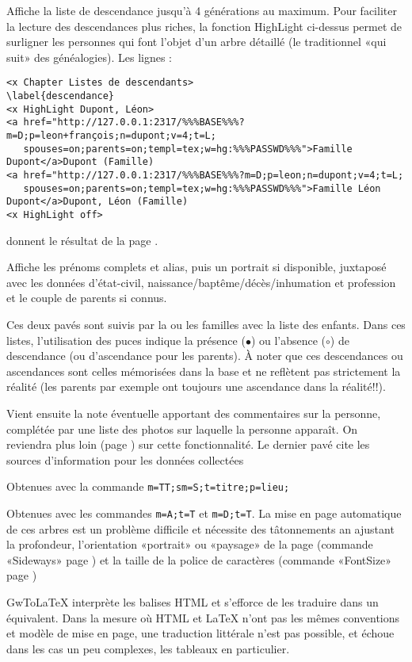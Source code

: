 \begin{description}[style=nextline]
\item[Liste de descendance] Affiche la liste de descendance jusqu'à 4
générations au maximum. Pour faciliter la lecture des descendances plus riches,
la fonction HighLight ci-dessus permet de surligner les personnes
qui font l'objet d'un arbre détaillé (le traditionnel «qui suit» des généalogies).
Les lignes :
\begin{verbatim}
<x Chapter Listes de descendants>
\label{descendance}
<x HighLight Dupont, Léon>
<a href="http://127.0.0.1:2317/%%%BASE%%%?m=D;p=leon+françois;n=dupont;v=4;t=L;
   spouses=on;parents=on;templ=tex;w=hg:%%%PASSWD%%%">Famille Dupont</a>Dupont (Famille)
<a href="http://127.0.0.1:2317/%%%BASE%%%?m=D;p=leon;n=dupont;v=4;t=L;
   spouses=on;parents=on;templ=tex;w=hg:%%%PASSWD%%%">Famille Léon Dupont</a>Dupont, Léon (Famille)
<x HighLight off>
\end{verbatim}
donnent le résultat de la page \pageref{descendance}.

\item[Page perso] Affiche les prénoms complets et alias, puis
un portrait si disponible, juxtaposé avec les
données d'état-civil, naissance/baptême/décès/inhumation et profession
et le couple de parents si connus.

Ces deux pavés sont suivis par la ou les familles avec la liste des enfants.
Dans ces listes, l'utilisation des puces indique la présence ($\bullet$)
ou l'absence ($\circ$) de descendance (ou d'ascendance pour les parents).
À noter que ces descendances ou ascendances sont celles mémorisées dans la base
et ne reflètent pas strictement la réalité (les parents par exemple ont toujours
une ascendance dans la réalité!!).

Vient ensuite la note éventuelle apportant des commentaires sur la personne,
complétée par une liste des photos sur laquelle la personne apparaît. 
On reviendra plus loin (page \pageref{images}) sur cette fonctionnalité.
Le dernier pavé cite les sources d'information pour les données collectées


\item[Liste par titre] Obtenues avec la commande
\verb|m=TT;sm=S;t=titre;p=lieu;|

\item[Arbres] Obtenues avec les commandes \verb|m=A;t=T| et \verb|m=D;t=T|.
La mise en page automatique de ces arbres est un problème difficile et
nécessite des tâtonnements an ajustant la profondeur, l'orientation «portrait»
ou «paysage» de la page (commande «Sideways» page \pageref{sideways}) et la
taille de la police de caractères (commande «FontSize» page \pageref{fontsize})

\item[Autres pages] GwToLaTeX interprète les balises HTML et s'efforce de
les traduire dans un équivalent. Dans la mesure où HTML et LaTeX n'ont pas
les mêmes conventions et modèle de mise en page, une traduction littérale
n'est pas possible, et échoue dans les cas un peu complexes, les tableaux 
en particulier.

\end{description}

